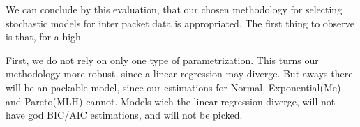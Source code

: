 We can conclude by this evaluation, that our chosen methodology for selecting stochastic models for inter packet data is appropriated. The first thing to observe is that, for a high 

First, we do not rely on only one type of parametrization. This turns our methodology more robust, since a linear regression may diverge. But aways there will be an packable model, since our estimations for Normal, Exponential(Me) and Pareto(MLH) cannot. Models wich the linear regression diverge, will not have god BIC/AIC estimations, and will not be picked. 




